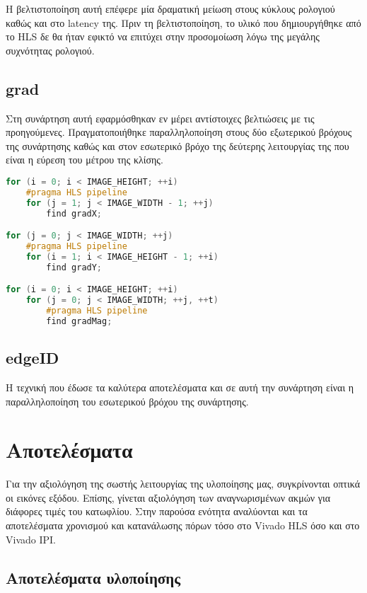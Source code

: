 Η βελτιστοποίηση αυτή επέφερε μία δραματική μείωση στους κύκλους ρολογιού καθώς και στο latency της. Πριν τη βελτιστοποίηση, το υλικό που δημιουργήθηκε από το HLS δε θα ήταν εφικτό να επιτύχει στην προσομοίωση λόγω της μεγάλης συχνότητας ρολογιού.

\subsection{grad}

Στη συνάρτηση αυτή εφαρμόσθηκαν εν μέρει αντίστοιχες βελτιώσεις με τις προηγούμενες. Πραγματοποιήθηκε παραλληλοποίηση στους δύο εξωτερικού βρόχους της συνάρτησης καθώς και στον εσωτερικό βρόχο της δεύτερης λειτουργίας της που είναι η εύρεση του μέτρου της κλίσης.

\begin{lstlisting}[language=C++,belowskip=-0.3\baselineskip]
for (i = 0; i < IMAGE_HEIGHT; ++i)
	#pragma HLS pipeline
	for (j = 1; j < IMAGE_WIDTH - 1; ++j)
		find gradX;

for (j = 0; j < IMAGE_WIDTH; ++j)
	#pragma HLS pipeline
	for (i = 1; i < IMAGE_HEIGHT - 1; ++i)
		find gradY;

for (i = 0; i < IMAGE_HEIGHT; ++i)
	for (j = 0; j < IMAGE_WIDTH; ++j, ++t)
		#pragma HLS pipeline
		find gradMag;
\end{lstlisting}
\subsection{edgeID}

Η τεχνική που έδωσε τα καλύτερα αποτελέσματα και σε αυτή την συνάρτηση είναι η παραλληλοποίηση του εσωτερικού βρόχου της συνάρτησης.

\section{Αποτελέσματα}

Για την αξιολόγηση της σωστής λειτουργίας της υλοποίησης μας, συγκρίνονται οπτικά οι εικόνες εξόδου. Επίσης, γίνεται αξιολόγηση των αναγνωρισμένων ακμών για διάφορες τιμές του κατωφλίου. Στην παρούσα ενότητα αναλύονται και τα αποτελέσματα χρονισμού και κατανάλωσης πόρων τόσο στο Vivado HLS όσο και στο Vivado IPI.
\subsection{Αποτελέσματα υλοποίησης}

